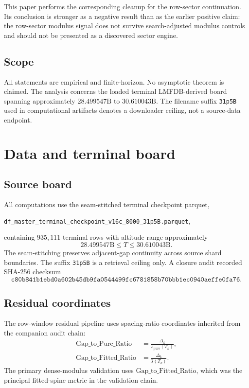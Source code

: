 \documentclass[11pt]{article}
\newcommand{\terminalsha}{c80b841b1ebd0a602b45db9fa0544499fc6781858b70bbb1ec0940aeffe0fa76}
\begin{document}
This paper performs the corresponding cleanup for the row-sector continuation. Its conclusion is stronger as a negative result than as the earlier positive claim: the row-sector modulus signal does not survive search-adjusted modulus controls and should not be presented as a discovered sector engine.

\subsection{Scope}

All statements are empirical and finite-horizon. No asymptotic theorem is claimed. The analysis concerns the loaded terminal LMFDB-derived board spanning approximately \(28.499547\mathrm{B}\) to \(30.610043\mathrm{B}\). The filename suffix \texttt{31p5B} used in computational artifacts denotes a downloader ceiling, not a source-data endpoint.

\section{Data and terminal board}

\subsection{Source board}

All computations use the seam-stitched terminal checkpoint parquet,
\begin{center}
\texttt{df\_master\_terminal\_checkpoint\_v16c\_8000\_31p5B.parquet},
\end{center}
containing \(935{,}111\) terminal rows with altitude range approximately
\[
28.499547\mathrm{B}\le T\le 30.610043\mathrm{B}.
\]
The seam-stitching preserves adjacent-gap continuity across source shard boundaries. The suffix \texttt{31p5B} is a retrieval ceiling only. A closure audit recorded SHA-256 checksum
\[
\texttt{\terminalsha}.
\]

\subsection{Residual coordinates}

The row-window residual pipeline uses spacing-ratio coordinates inherited from the companion audit chain:
\begin{align}
    \mathrm{Gap\_to\_Pure\_Ratio}   &= \frac{\Delta_k}{s_{\mathrm{pure}}(T_k)},\\
    \mathrm{Gap\_to\_Fitted\_Ratio} &= \frac{\Delta_k}{\widehat{s}(T_k)}.
\end{align}
The primary dense-modulus validation uses \(\mathrm{Gap\_to\_Fitted\_Ratio}\), which was the principal fitted-spine metric in the validation chain.
\end{document}
